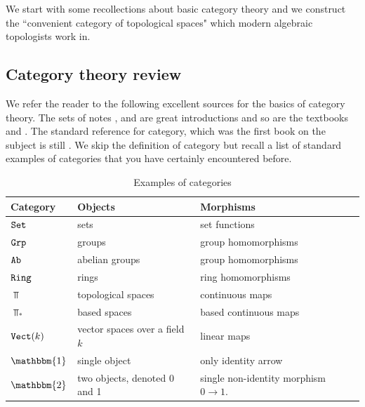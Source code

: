 \documentclass{article}[11pt]
\begin{document}
We start with some recollections about basic category theory and we construct the ``convenient category of topological spaces" which modern algebraic topologists work in.

\subsection{Category theory review}

We refer the reader to the following excellent sources for the basics of category theory. The sets of notes \cite{WOMP},\cite{Torres-cat} and \cite{mehrle} are great introductions and so are the textbooks \cite{leinster} and \cite{Riehl-context}. The standard reference for category, which was the first book on the subject is still \cite{maclane}. We skip the definition of category but recall a list of standard examples of categories that you have certainly encountered  before. 

\begin{table}[h]
    \centering
    \caption{Examples of categories}
    \begin{tabular}{ p{2cm} l  p{5cm}  p{8cm} }
        \toprule
\textbf{Category}      
& \textbf{Objects}   
& \textbf{Morphisms} \\\midrule
$\texttt{Set}$ & sets & set functions \\\hline

$\texttt{Grp}$ & groups &group homomorphisms \\\hline
	 $\texttt{Ab}$ & abelian groups &group homomorphisms \\\hline
         $\texttt{Ring}$ & rings& ring homomorphisms \\\hline
	 $\Top$& topological spaces & continuous maps\\\hline
	 $\Top_\ast$ & based spaces & based continuous maps\\\hline
	 $\texttt{Vect}(k)$& vector spaces over a field $k$ & linear maps\\\hline
	 $\mathbbm{1}$ & single object & only identity arrow\\\hline
	 $\mathbbm{2}$ & two objects, denoted 0 and 1 & single non-identity morphism $0\to 1$.\\
	 \bottomrule
    \end{tabular}
\end{table}
\end{document}
